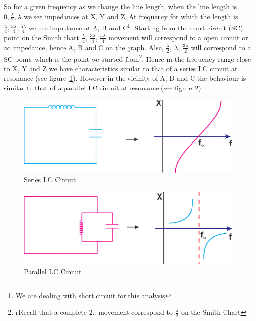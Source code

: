 So for a given frequency as we change the line length, when the line length is $ 0, \frac{\lambda}{2}, \lambda $ we see impedances at X, Y and Z. At frequency for which the length is $ \frac{\lambda}{4}, \frac{3\lambda}{4}, \frac{5\lambda}{4} $ we see impedance at A, B and C\footnote{
We are dealing with short circuit for this analysis
}. Starting from the short circuit (SC) point on the Smith chart $ \frac{\lambda}{4} $, $ \frac{3\lambda}{4} $, $ \frac{5\lambda}{4} $ movement will correspond to a open circuit or $ \infty $ impedance,  hence A, B and C on the graph. Also, $ \frac{\lambda}{2} $, $ \lambda $, $ \frac{3\lambda}{2} $ will correspond to a SC point, which is the point we started from\footnote{
rRecall that a complete $ 2\pi $ movement correspond to $ \frac{\lambda}{2} $ on the Smith Chart
}. Hence in the frequency range close to X, Y and Z we have characteristics similar to that of a series LC circuit
at resonance (see figure~\ref{fig:group10diagram12}). However in the vicinity of A, B and C the behaviour is similar to that of a parallel LC circuit at resonance (see figure~\ref{fig:group10diagram13}). 
\begin{figure}[h]
\centering
\includegraphics[width=1\linewidth]{./graphics/group10diagram11}
\caption{Series LC Circuit}
\label{fig:group10diagram12}
\end{figure}
\begin{figure}[h]
\centering
\includegraphics[width=1\linewidth]{./graphics/group10diagram12}
\caption{Parallel LC Circuit}
\label{fig:group10diagram13}
\end{figure}

